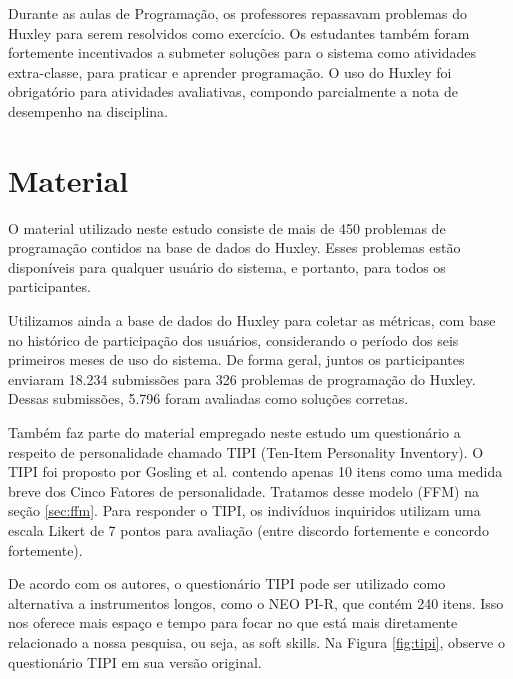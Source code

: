 Durante as aulas de Programação, os professores repassavam problemas do Huxley para serem resolvidos como exercício. Os estudantes também foram fortemente incentivados a submeter soluções para o sistema como atividades extra-classe, para praticar e aprender programação. O uso do Huxley foi obrigatório para atividades avaliativas, compondo parcialmente a nota de desempenho na disciplina.

\section{Material}
\label{sec:material}

O material utilizado neste estudo consiste de mais de 450 problemas de programação contidos na base de dados do Huxley. Esses problemas estão disponíveis para qualquer usuário do sistema, e portanto, para todos os participantes.

Utilizamos ainda a base de dados do Huxley para coletar as métricas, com base no histórico de participação dos usuários, considerando o período dos seis primeiros meses de uso do sistema. De forma geral, juntos os participantes enviaram 18.234 submissões para 326 problemas de programação do Huxley. Dessas submissões, 5.796 foram avaliadas como soluções corretas.


Também faz parte do material empregado neste estudo um questionário a respeito de personalidade chamado TIPI (Ten-Item Personality Inventory). O TIPI foi proposto por Gosling et al. \cite{gosling:03} contendo apenas 10 itens como uma medida breve dos Cinco Fatores de personalidade. Tratamos desse modelo (FFM) na seção \ref{sec:ffm}. Para responder o TIPI, os indivíduos inquiridos utilizam uma escala Likert de 7 pontos para avaliação (entre discordo fortemente e concordo fortemente).

De acordo com os autores, o questionário TIPI pode ser utilizado como alternativa a instrumentos longos, como o NEO PI-R, que contém 240 itens. Isso nos oferece mais espaço e tempo para focar no que está mais diretamente relacionado a nossa pesquisa, ou seja, as soft skills. Na Figura \ref{fig:tipi}, observe o questionário TIPI em sua versão original.

